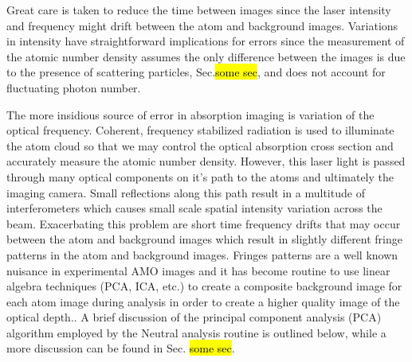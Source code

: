 Great care is taken to reduce the time between images since the laser intensity and frequency might drift between the atom and background images. 
Variations in intensity have straightforward implications for errors since the measurement of the atomic number density assumes the only difference between the images is due to the presence of scattering particles, Sec.\hl{some sec}, and does not account for fluctuating photon number. 

The more insidious source of error in absorption imaging is variation of the optical frequency. 
Coherent, frequency stabilized radiation is used to illuminate the atom cloud so that we may control the optical absorption cross section and accurately measure the atomic number density. 
However, this laser light is passed through many optical components on it's path to the atoms and ultimately the imaging camera. 
Small reflections along this path result in a multitude of interferometers which causes small scale spatial intensity variation across the beam. 
Exacerbating this problem are short time frequency drifts that may occur between the atom and background images which result in slightly different fringe patterns in the atom and background images. 
Fringes patterns are a well known nuisance in experimental AMO images and it has become routine to use linear algebra techniques (PCA, ICA, etc.) to create a composite background image for each atom image during analysis \cite{Segal2009} in order to create a higher quality image of the optical depth.. 
A brief discussion of the principal component analysis (PCA) algorithm employed by the Neutral analysis routine is outlined below, while a more discussion can be found in Sec. \hl{some sec}. 

